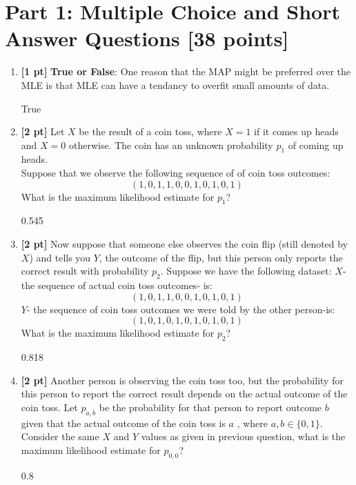 \documentclass{article}
\begin{document}
\section*{Part 1: Multiple Choice and Short Answer Questions [38 points]} 
\begin{enumerate}
    \item \textbf{[1 pt]} \textbf{True or False}: One reason that the MAP might be preferred over the MLE is that MLE can have a tendancy to overfit small amounts of data.
    
    \begin{tcolorbox}[width=\linewidth/3,height=1.5cm]
    True
    \end{tcolorbox}
    
    \item \textbf{[2 pt]} Let $X$ be the result of a coin toss, where $X=1$ if it comes up heads and $X=0$ otherwise.  The coin has an unknown probability $p_1$ of coming up heads.
    \\ Suppose that we observe the following sequence of of coin toss outcomes:
    $$
    (1,0,1,1,0,0,1,0,1,0,1)
    $$
    What is the maximum likelihood estimate for $p_1$?
    \begin{tcolorbox}[width=\linewidth/3,height=1.5cm]
    0.545
    \end{tcolorbox}
    
    \item \textbf{[2 pt]} Now suppose that someone else observes the coin flip (still denoted by $X$) and tells you $Y$, the outcome of the flip, but this person only reports the correct result with probability $p_2$.  Suppose we have the following dataset:
    $X$-the sequence of actual coin toss outcomes- is: \\
    $$
    (1,0,1,1,0,0,1,0,1,0,1)
    $$
    $Y$- the sequence of coin toss outcomes we were told by the other person-is:\\
    $$
    (1,0,1,0,1,0,1,0,1,0,1)
    $$
    What is the maximum likelihood estimate for $p_2$?
    
    \begin{tcolorbox}[width=\linewidth/3,height=1.5cm]
    0.818
    \end{tcolorbox}
    
    \item \textbf{[2 pt]} Another person is observing the coin toss too, but the probability for this person to report the correct result depends on the actual outcome of the coin toss. Let  $p_{a,b}$ be the probability for that person to report outcome $b$ given that the actual outcome of the coin toss is $a$ , where  $a,b\in\{0,1\}$. Consider the same  $X$  and  $Y$  values as given in previous question, what is the maximum likelihood estimate for  $p_{0,0}$?
    \begin{tcolorbox}[width=\linewidth/3,height=1.5cm]
    0.8
    \end{tcolorbox}
    

\end{enumerate}
\end{document}
